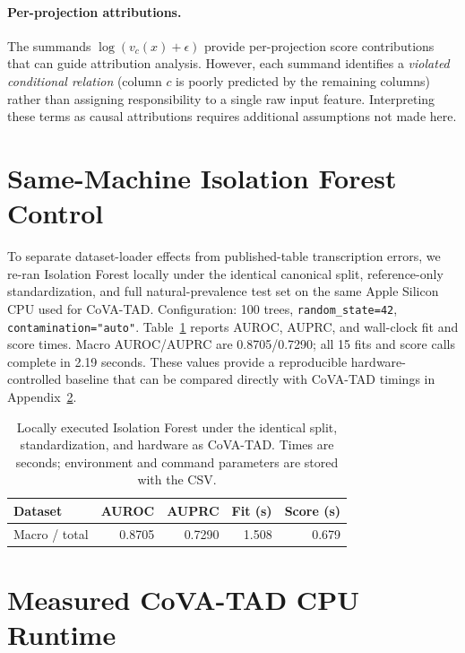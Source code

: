 \documentclass{article}
\begin{document}
\paragraph{Per-projection attributions.}
The summands $\log(v_c(x) + \epsilon)$ provide per-projection score contributions that can guide attribution analysis. However, each summand identifies a \emph{violated conditional relation} (column $c$ is poorly predicted by the remaining columns) rather than assigning responsibility to a single raw input feature. Interpreting these terms as causal attributions requires additional assumptions not made here.

\section{Same-Machine Isolation Forest Control}
\label{app:local-iforest}

To separate dataset-loader effects from published-table transcription errors, we re-ran Isolation Forest locally under the identical canonical split, reference-only standardization, and full natural-prevalence test set on the same Apple Silicon CPU used for CoVA-TAD. Configuration: 100 trees, \texttt{random\_state=42}, \texttt{contamination="auto"}. Table~\ref{tab:local-iforest} reports AUROC, AUPRC, and wall-clock fit and score times. Macro AUROC/AUPRC are 0.8705/0.7290; all 15 fits and score calls complete in 2.19 seconds. These values provide a reproducible hardware-controlled baseline that can be compared directly with CoVA-TAD timings in Appendix~\ref{app:runtime}.

\begin{table}[h]
\centering
\caption{Locally executed Isolation Forest under the identical split, standardization, and hardware as CoVA-TAD. Times are seconds; environment and command parameters are stored with the CSV.}
\label{tab:local-iforest}
\small
\setlength{\tabcolsep}{6pt}
\begin{tabular}{lrrrr}
\toprule
Dataset & AUROC & AUPRC & Fit (s) & Score (s)\\
\midrule
%
Macro / total & 0.8705 & 0.7290 & 1.508 & 0.679\\
\bottomrule
\end{tabular}
\end{table}

\section{Measured CoVA-TAD CPU Runtime}
\label{app:runtime}
\end{document}
